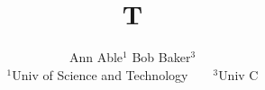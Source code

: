 \documentclass{article}
\begin{document}
\title{T}
\author{Ann Able$^{1}$ Bob Baker$^{3}$\\ \vspace{.15em} $^{1}$Univ of Science and Technology~~~~$^{3}$Univ C}
\date{}
\maketitle
\end{document}
